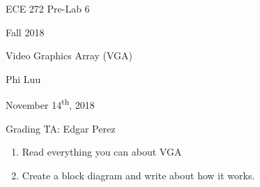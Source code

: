 \documentclass[12pt]{article}
\begin{document}
\begin{titlepage}
  \begin{center} \LARGE
    \vspace*{1.5in}

    ECE 272 Pre-Lab 6

    Fall 2018

    \vfill

    Video Graphics Array (VGA)

    Phi Luu

    \vfill

    November 14\textsuperscript{th}, 2018

    Grading TA: Edgar Perez

    \vspace{1.5in}
  \end{center}
\end{titlepage}

\begin{enumerate}
  \item Read everything you can about VGA



  \item Create a block diagram and write about how it works.


\end{enumerate}
\end{document}
